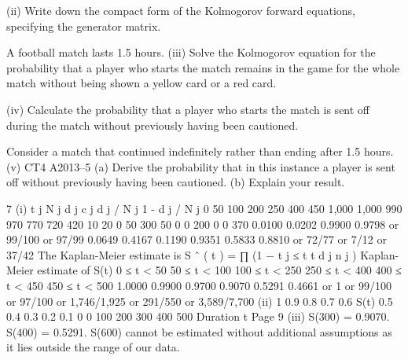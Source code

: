 \documentclass[a4paper,12pt]{article}
\begin{document}
\begin{enumerate}
(ii) Write down the compact form of the Kolmogorov forward equations,
specifying the generator matrix.

A football match lasts 1.5 hours.
(iii) Solve the Kolmogorov equation for the probability that a player who starts the
match remains in the game for the whole match without being shown a yellow
card or a red card.

(iv) Calculate the probability that a player who starts the match is sent off during
the match without previously having been cautioned.

Consider a match that continued indefinitely rather than ending after 1.5 hours.
(v)
CT4 A2013–5
(a) Derive the probability that in this instance a player is sent off without
previously having been cautioned.
(b) Explain your result.

7
(i)
t j N j d j c j d j / N j 1 - d j / N j 0
50
100
200
250
400
450 1,000
1,000
990
970
770
720
420 10
20
0
50
300
50 0
0
200
0
0
370 0.0100
0.0202 0.9900
0.9798 or 99/100
or 97/99
0.0649
0.4167
0.1190 0.9351
0.5833
0.8810 or 72/77
or 7/12
or 37/42
The Kaplan-Meier estimate is S ˆ ( t ) = ∏ (1 −
t j ≤ t
t
d j
n j
)
Kaplan-Meier estimate of S(t)
0 ≤ t < 50
50 ≤ t < 100
100 ≤ t < 250
250 ≤ t < 400
400 ≤ t < 450
450 ≤ t < 500
1.0000
0.9900
0.9700
0.9070
0.5291
0.4661
or 1
or 99/100
or 97/100
or 1,746/1,925
or 291/550
or 3,589/7,700
(ii)
1
0.9
0.8
0.7
0.6
S(t) 0.5
0.4
0.3
0.2
0.1
0
0
100
200
300
400
500
Duration t
Page 9 %
(iii)
S(300) = 0.9070.
S(400) = 0.5291.
S(600) cannot be estimated without additional assumptions
as it lies outside the range of our data.


\end{enumerate}
\end{document}
